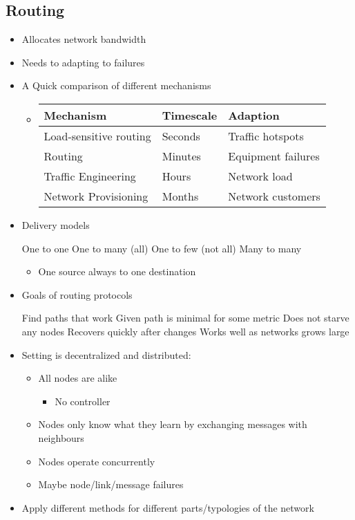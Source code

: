 \subsection{Routing}
\begin{itemize}
    \item Allocates network bandwidth
    \item Needs to adapting to failures
    \item A Quick comparison of different mechanisms
        \begin{itemize}
            \item
\begin{tabular}{| l | l | l}
    Mechanism & Timescale & Adaption\\\hline
    Load-sensitive routing & Seconds & Traffic hotspots\\
    Routing & Minutes & Equipment failures\\
    Traffic Engineering & Hours & Network load\\
    Network Provisioning & Months & Network customers
\end{tabular}
        \end{itemize}
    \item Delivery models
        \begin{itemize}
             One to one
             One to many (all)
             One to few (not all)
             Many to many
                \begin{itemize}
                    \item One source always to one destination
                \end{itemize}
        \end{itemize}
    \item Goals of routing protocols
        \begin{itemize}
             Find paths that work
             Given path is minimal for some metric
             Does not starve any nodes
             Recovers quickly after changes
             Works well as networks grows large
        \end{itemize}
    \item Setting is decentralized and distributed:
        \begin{itemize}
            \item All nodes are alike
                \begin{itemize}
                    \item No controller
                \end{itemize}
            \item Nodes only know what they learn by exchanging messages with neighbours
            \item Nodes operate concurrently
            \item Maybe node/link/message failures
        \end{itemize}
    \item Apply different methods for different parts/typologies of the network
\end{itemize}

